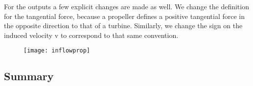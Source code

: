 For the outputs a few explicit changes are made as well.  We change the definition for the tangential force, because a propeller defines a positive tangential force in the opposite direction to that of a turbine.  Similarly, we change the sign on the induced velocity v to correspond to that same convention.


\begin{figure}[htbp]
\centering
\texttt{[image: inflowprop]}
\caption{}
\label{fig:inflowprop}
\end{figure}

\subsection{Summary}


